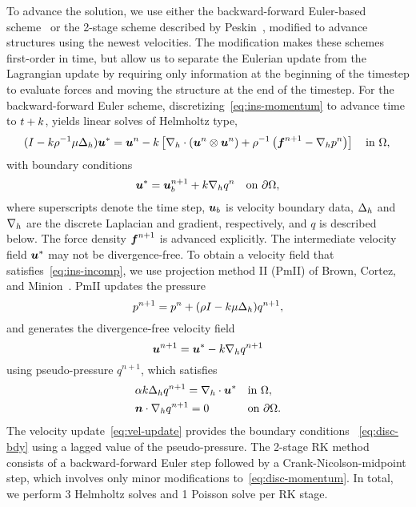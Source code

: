 

To advance the solution, we use either the backward-forward Euler-based scheme~%
\cite{Ascher:1997tm} or the 2-stage scheme described by Peskin~\cite{Peskin:2002go},
modified to advance structures using the newest velocities. The modification makes these
schemes first-order in time, but allow us to separate the Eulerian update from the
Lagrangian update by requiring only information at the beginning of the timestep to
evaluate forces and moving the structure at the end of the timestep. For the
backward-forward Euler scheme, discretizing~\eqref{eq:ins-momentum} to advance time to
$t+k$, yields linear solves of Helmholtz type,
\begin{equation}\label{eq:disc-momentum}
    (I - \timestep\rho^{-1}\mu \laplacian_h) \u^\ast = \u^n - \timestep\left[\div[h]\left(\u^n\otimes\u^n\right) + \rho^{-1}\left(\f^{n+1} - \grad[h]p^n\right)\right] \quad\text{in}~\domain, \\
\end{equation}
with boundary conditions
\begin{equation}\label{eq:disc-bdy}
    \u^\ast = \u^{n+1}_b + \timestep \grad[h] q^{n} \quad\text{on}~\partial\domain,
\end{equation}
where superscripts denote the time step, $\boldsymbol{u}_b$ is velocity boundary data, $\Delta_h$
and $\grad[h]$ are the discrete Laplacian and gradient, respectively, and $q$ is
described below. The force density $\boldsymbol{f}^{n+1}$ is advanced explicitly. The intermediate
velocity field $\boldsymbol{u}^\ast$ may not be divergence-free. To obtain a velocity field that
satisfies~\eqref{eq:ins-incomp}, we use projection method II (PmII) of Brown, Cortez, and
Minion~\cite{Brown:2001bq}. PmII updates the pressure
\begin{equation*}
    p^{n+1} = p^n + (\rho I - k\mu\Delta_h)q^{n+1},
\end{equation*}
and generates the divergence-free velocity field
\begin{equation}\label{eq:vel-update}
    \u^{n+1} = \u^\ast - \timestep\grad[h]q^{n+1}
\end{equation}
using pseudo-pressure $q^{n+1}$, which satisfies
\begin{equation}
\begin{alignedat}{2}
    &\alpha k \laplacian_h q^{n+1} = \div[h]\u^\ast &&\quad \text{in}~\domain, \\
    &\n\cdot\grad[h] q^{n+1} = 0                    &&\quad \text{on}~\partial\domain.
\end{alignedat}
\end{equation}
The velocity update~\eqref{eq:vel-update} provides the boundary conditions~%
\eqref{eq:disc-bdy} using a lagged value of the pseudo-pressure. The 2-stage RK method
consists of a backward-forward Euler step followed by a Crank-Nicolson-midpoint step,
which involves only minor modifications to~\eqref{eq:disc-momentum}. In total, we perform
3 Helmholtz solves and 1 Poisson solve per RK stage.

